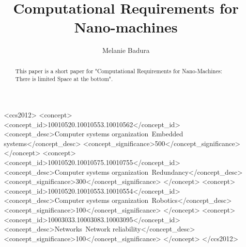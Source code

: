 \documentclass[10pt,sigconf]{acmart}
\begin{document}
\title{Computational Requirements for Nano-machines}

\author{Melanie Badura}




\renewcommand{\shortauthors}{F. Lastname et al.}


\begin{abstract}
This paper is a short paper for "Computational Requirements for 
Nano-Machines: There is limited Space at the bottom".\cite{lau2017computational}{}
\end{abstract}

%
%
\begin{CCSXML}
<ccs2012>
 <concept>
  <concept_id>10010520.10010553.10010562</concept_id>
  <concept_desc>Computer systems organization~Embedded systems</concept_desc>
  <concept_significance>500</concept_significance>
 </concept>
 <concept>
  <concept_id>10010520.10010575.10010755</concept_id>
  <concept_desc>Computer systems organization~Redundancy</concept_desc>
  <concept_significance>300</concept_significance>
 </concept>
 <concept>
  <concept_id>10010520.10010553.10010554</concept_id>
  <concept_desc>Computer systems organization~Robotics</concept_desc>
  <concept_significance>100</concept_significance>
 </concept>
 <concept>
  <concept_id>10003033.10003083.10003095</concept_id>
  <concept_desc>Networks~Network reliability</concept_desc>
  <concept_significance>100</concept_significance>
 </concept>
</ccs2012>  
\end{CCSXML}






\maketitle
\end{document}
